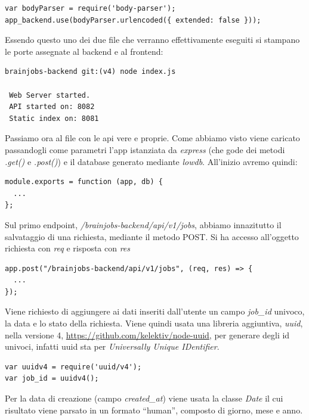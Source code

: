 \documentclass[a4paper,12pt, oneside]{book}
\begin{document}
\begin{shaded}
\begin{verbatim}
var bodyParser = require('body-parser');
app_backend.use(bodyParser.urlencoded({ extended: false }));
\end{verbatim}
\end{shaded}
\newpage
Essendo questo uno dei due file che verranno effettivamente eseguiti si stampano le porte assegnate al backend e al frontend:
\begin{shaded}
\begin{verbatim}
brainjobs-backend git:(v4) node index.js

 Web Server started.
 API started on: 8082
 Static index on: 8081
\end{verbatim}
\end{shaded}
Passiamo ora al file con le api vere e proprie. Come abbiamo visto viene caricato
passandogli come parametri l'app istanziata da \textit{express} (che gode dei metodi \textit{.get()} e \textit{.post()}) e il database generato mediante \textit{lowdb}. All'inizio avremo quindi:
\begin{shaded}
\begin{verbatim}
module.exports = function (app, db) {
  ...
};
\end{verbatim}
\end{shaded}
Sul primo endpoint, \textit{/brainjobs-backend/api/v1/jobs}, abbiamo innazitutto il salvataggio
di una richiesta, mediante il metodo POST. Si ha accesso all'oggetto richiesta con \textit{req} e risposta con \textit{res}
\begin{shaded}
\begin{verbatim}
app.post("/brainjobs-backend/api/v1/jobs", (req, res) => { 
  ...
});
\end{verbatim}
\end{shaded}
Viene richiesto di aggiungere ai dati inseriti dall'utente un campo \textit{job\_id} univoco, la data e lo stato della richiesta.
Viene quindi usata una libreria aggiuntiva, \textit{uuid}, nella versione 4, \url{https://github.com/kelektiv/node-uuid}, per generare degli id univoci, infatti uuid sta per \textit{Universally Unique IDentifier}.
\begin{shaded}
\begin{verbatim}
var uuidv4 = require('uuid/v4');
var job_id = uuidv4();
\end{verbatim}
\end{shaded}
Per la data di creazione (campo \textit{created\_at}) viene usata la classe \textit{Date} il cui risultato viene parsato in un formato ``human'', composto di giorno, mese e anno.
\end{document}

